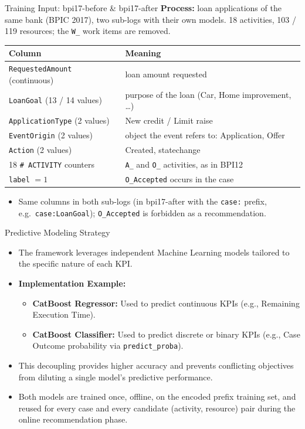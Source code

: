 \documentclass[aspectratio=169]{beamer} %
\begin{document}
\begin{frame}{Training Input: bpi17-before \& bpi17-after}
  \footnotesize
  \textbf{Process:} loan applications of the same bank (BPIC 2017), two sub-logs with
  their own models. 18 activities, 103 / 119 resources; the \texttt{W\_} work items are removed.
  \begin{center}
  \begin{tabular}{lp{8.5cm}}
    \toprule
    \textbf{Column} & \textbf{Meaning} \\
    \midrule
    \texttt{RequestedAmount} (continuous) & loan amount requested \\
    \texttt{LoanGoal} (13 / 14 values) & purpose of the loan (Car, Home improvement, \dots) \\
    \texttt{ApplicationType} (2 values) & New credit / Limit raise \\
    \texttt{EventOrigin} (2 values) & object the event refers to: Application, Offer \\
    \texttt{Action} (2 values) & Created, statechange \\
    18 \texttt{\# ACTIVITY} counters & \texttt{A\_} and \texttt{O\_} activities, as in BPI12 \\
    \midrule
    \texttt{label} $=1$ & \texttt{O\_Accepted} occurs in the case \\
    \bottomrule
  \end{tabular}
  \end{center}
  \begin{itemize}
    \item Same columns in both sub-logs (in bpi17-after with the \texttt{case:}
      prefix, e.g.\ \texttt{case:LoanGoal}); \texttt{O\_Accepted} is
      \alert{forbidden} as a recommendation.
  \end{itemize}
\end{frame}

\begin{frame}{Predictive Modeling Strategy}
    \begin{itemize}
        \item The framework leverages independent Machine Learning models tailored to the specific nature of each KPI.
        \item \textbf{Implementation Example:}
        \begin{itemize}
            \item \textbf{CatBoost Regressor:} Used to predict continuous KPIs (e.g., Remaining Execution Time).
            \item \textbf{CatBoost Classifier:} Used to predict discrete or binary KPIs (e.g., Case Outcome probability via \texttt{predict\_proba}).
        \end{itemize}
        \item This decoupling provides higher accuracy and prevents conflicting objectives from diluting a single model's predictive performance.
        \item Both models are trained once, offline, on the encoded prefix training set, and reused for every case and every candidate (activity, resource) pair during the online recommendation phase.
    \end{itemize}
\end{frame}
\end{document}
